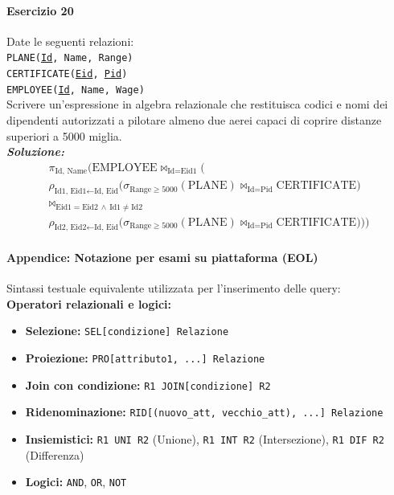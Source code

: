 \documentclass[12pt]{extarticle}
\begin{document}
\vspace{1em}

\paragraph{Esercizio 20} Date le seguenti relazioni:\\

\noindent \texttt{PLANE(\underline{Id}, Name, Range)}\\
\texttt{CERTIFICATE(\underline{Eid}, \underline{Pid})}\\
\texttt{EMPLOYEE(\underline{Id}, Name, Wage)}\\[0.5em]

\noindent Scrivere un'espressione in algebra relazionale che restituisca codici e nomi dei dipendenti autorizzati a pilotare almeno due aerei capaci di coprire distanze superiori a 5000 miglia.\\

\noindent \textbf{\textit{Soluzione:}}
\[
\begin{gathered}
\pi_{\text{Id, Name}} \Big( \text{EMPLOYEE} \bowtie_{\text{Id} = \text{Eid1}} \Big( \\
\rho_{\text{Id1, Eid1} \leftarrow \text{Id, Eid}} \big( \sigma_{\text{Range} \ge 5000}(\text{PLANE}) \bowtie_{\text{Id} = \text{Pid}} \text{CERTIFICATE} \big) \\
\bowtie_{\text{Eid1} = \text{Eid2} \,\land\, \text{Id1} \neq \text{Id2}} \\
\rho_{\text{Id2, Eid2} \leftarrow \text{Id, Eid}} \big( \sigma_{\text{Range} \ge 5000}(\text{PLANE}) \bowtie_{\text{Id} = \text{Pid}} \text{CERTIFICATE} \big) \Big) \Big)
\end{gathered}
\]

\vspace{1.5em}

\paragraph{Appendice: Notazione per esami su piattaforma (EOL)} Sintassi testuale equivalente utilizzata per l'inserimento delle query:\\

\noindent \textbf{Operatori relazionali e logici:}
\begin{itemize}
    \item \textbf{Selezione:} \texttt{SEL[condizione] Relazione}
    \item \textbf{Proiezione:} \texttt{PRO[attributo1, ...] Relazione}
    \item \textbf{Join con condizione:} \texttt{R1 JOIN[condizione] R2}
    \item \textbf{Ridenominazione:} \texttt{RID[(nuovo\_att, vecchio\_att), ...] Relazione}
    \item \textbf{Insiemistici:} \texttt{R1 UNI R2} (Unione), \texttt{R1 INT R2} (Intersezione), \texttt{R1 DIF R2} (Differenza)
    \item \textbf{Logici:} \texttt{AND}, \texttt{OR}, \texttt{NOT}
\end{itemize}
\end{document}
